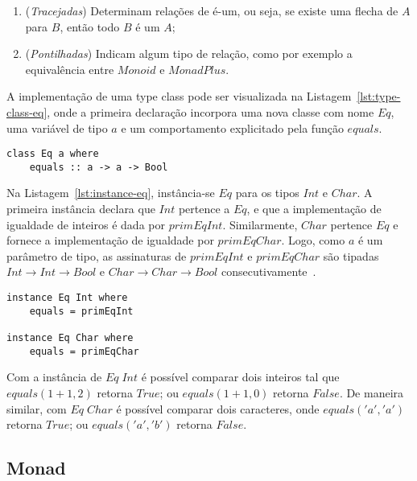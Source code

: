 \documentclass[10pt, conference]{IEEEtran}
\begin{document}
\begin{enumerate}[label=(\alph*), leftmargin=3em, topsep = 0pt, itemsep = 1ex, partopsep = 1ex, parsep = 1ex]
	\item (\textit{Tracejadas}) Determinam relações de é-um, ou seja, se existe uma flecha de $A$ para $B$, então todo $B$ é um $A$;
	\item (\textit{Pontilhadas}) Indicam algum tipo de relação, como por exemplo a equivalência entre $Monoid$ e $MonadPlus$.
\end{enumerate}

A implementação de uma type class pode ser visualizada na Listagem~\ref{lst:type-class-eq}, onde a primeira declaração incorpora uma nova classe com nome $Eq$, uma variável de tipo $a$ e um comportamento explicitado pela função $equals$. 

\begin{lstlisting}[caption={Type class Eq~\cite{hall1996type}}, label={lst:type-class-eq}]
class Eq a where
	equals :: a -> a -> Bool
\end{lstlisting}

Na Listagem~\ref{lst:instance-eq}, instância-se $Eq$ para os tipos $Int$ e $Char$. A primeira instância declara que $Int$ pertence a $Eq$, e que a implementação de igualdade de inteiros é dada por $primEqInt$. Similarmente, $Char$ pertence $Eq$ e fornece a implementação de igualdade por $primEqChar$. Logo, como $a$ é um parâmetro de tipo, as assinaturas de $primEqInt$ e $primEqChar$ são tipadas ${Int \rightarrow Int \rightarrow Bool}$ e ${Char \rightarrow Char \rightarrow Bool}$ consecutivamente~\cite{hall1996type}.

\noindent\begin{minipage}[h]{\columnwidth}
\begin{lstlisting}[caption={Instâncias Eq\protect~\cite{hall1996type}}, label={lst:instance-eq}]
instance Eq Int where
	equals = primEqInt
	
instance Eq Char where
	equals = primEqChar
\end{lstlisting}
\end{minipage}

Com a instância de $Eq \; Int$ é possível comparar dois inteiros tal que ${equals({1 + 1}, 2)}$ retorna $True$; ou ${equals({1 + 1}, 0)}$ retorna $False$. De maneira similar, com $Eq \; Char$ é possível comparar dois caracteres, onde ${equals('a', {'a'})}$ retorna $True$; ou ${equals('a', {'b'})}$ retorna $False$.

\subsection{Monad}
\end{document}
